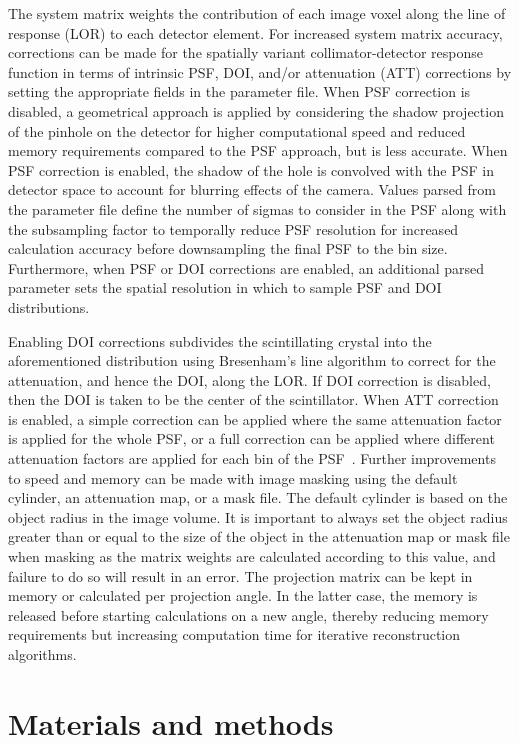 \documentclass[utf8]{FrontiersinHarvard} %
\begin{document}
The system matrix weights the contribution of each image voxel along the line of response (LOR) to each detector element. For increased system matrix accuracy, corrections can be made for the spatially variant collimator-detector response function in terms of intrinsic PSF, DOI, and/or attenuation (ATT) corrections by setting the appropriate fields in the parameter file. When PSF correction is disabled, a geometrical approach is applied by considering the shadow projection of the pinhole on the detector for higher computational speed and reduced memory requirements compared to the PSF approach, but is less accurate. When PSF correction is enabled, the shadow of the hole is convolved with the PSF in detector space to account for blurring effects of the camera. Values parsed from the parameter file define the number of sigmas to consider in the PSF along with the subsampling factor to temporally reduce PSF resolution for increased calculation accuracy before downsampling the final PSF to the bin size. Furthermore, when PSF or DOI corrections are enabled, an additional parsed parameter sets the spatial resolution in which to sample PSF and DOI distributions. 

Enabling DOI corrections subdivides the scintillating crystal into the aforementioned distribution using Bresenham's line algorithm to correct for the attenuation, and hence the DOI, along the LOR. If DOI correction is disabled, then the DOI is taken to be the center of the scintillator. When ATT correction is enabled, a simple correction can be applied where the same attenuation factor is applied for the whole PSF, or a full correction can be applied where different attenuation factors are applied for each bin of the PSF~\cite{fuster_2014}. Further improvements to speed and memory can be made with image masking using the default cylinder, an attenuation map, or a mask file. The default cylinder is based on the object radius in the image volume. It is important to always set the object radius greater than or equal to the size of the object in the attenuation map or mask file when masking as the matrix weights are calculated according to this value, and failure to do so will result in an error. The projection matrix can be kept in memory or calculated per projection angle. In the latter case, the memory is released before starting calculations on a new angle, thereby reducing memory requirements but increasing computation time for iterative reconstruction algorithms.

\section{Materials and methods}
\end{document}
